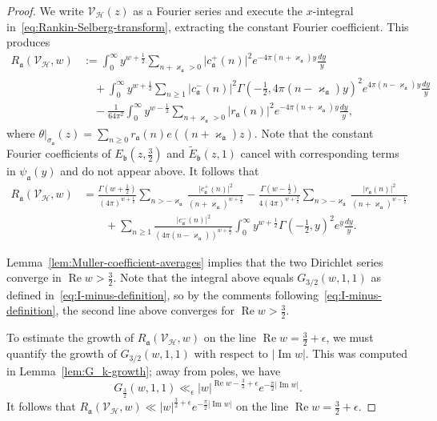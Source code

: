 \documentclass[11pt,reqno]{amsart}
\theoremstyle{plain}
\theoremstyle{definition}
\numberwithin{equation}{section}
\renewcommand{\Im}{\operatorname{Im}}
\renewcommand{\Re}{\operatorname{Re}}
\begin{document}
\begin{proof}
We write $\mathcal{V}_\mathcal{H}(z)$ as a Fourier series and execute the $x$-integral in~\eqref{eq:Rankin-Selberg-transform}, extracting the constant Fourier coefficient. This produces
\begin{align} \label{eq:Rankin-Selberg-transform-unfolded}
	R_\mathfrak{a}(\mathcal{V}_\mathcal{H}, w)
		& := \int_0^\infty y^{w+\frac{1}{2}} 
		\sum_{n +\varkappa_\mathfrak{a} > 0} \vert c_\mathfrak{a}^+(n) \vert^2 
		e^{-4\pi (n+\varkappa_\mathfrak{a}) y} \frac{dy}{y} \\
		& \quad +
		\int_0^\infty y^{w+\frac{1}{2}} \sum_{n \geq 1} \vert c_\mathfrak{a}^-(n) \vert^2
		\Gamma(-\tfrac{1}{2},4\pi (n-\varkappa_\mathfrak{a}) y)^2 
		e^{4\pi (n-\varkappa_\mathfrak{a}) y} \frac{dy}{y} \\
		& \quad - \frac{1}{64\pi^2} 
		\int_0^\infty y^{w-\frac{1}{2}}
			\sum_{n +\varkappa_\mathfrak{a} > 0} \vert r_\mathfrak{a}(n) \vert^2 e^{-4\pi (n + \varkappa_\mathfrak{a}) y} \frac{dy}{y},
\end{align}
where $\theta\vert_{\sigma_{\mathfrak{a}}}(z) = \sum_{n \geq 0} r_\mathfrak{a}(n) e((n+\varkappa_\mathfrak{a})z)$. Note that the constant Fourier coefficients of $E_\mathfrak{b}(z,\frac{3}{2})$ and $\widetilde{E}_\mathfrak{b}(z,1)$ cancel with corresponding terms in $\psi_{\mathfrak{a}}(y)$ and do not appear above. It follows that
\begin{align*}
	R_\mathfrak{a}(\mathcal{V}_\mathcal{H}, w)
		& = \frac{\Gamma(w+\frac{1}{2})}{(4\pi)^{w+\frac{1}{2}}}
		\sum_{n > -\varkappa_\mathfrak{a}} \!
				\frac{\vert c_\mathfrak{a}^+(n) \vert^2}{(n+\varkappa_\mathfrak{a})^{w+\frac{1}{2}}} 
		- \frac{\Gamma(w-\frac{1}{2})}{4 (4\pi)^{w+\frac{3}{2}}} 
			\sum_{n > -\varkappa_\mathfrak{a}} \!
				\frac{\vert r_\mathfrak{a}(n) \vert^2}{(n+\varkappa_\mathfrak{a})^{w-\frac{1}{2}}}  \\
		& \qquad 
		+ \sum_{n \geq 1} 
		\frac{\vert c_\mathfrak{a}^-(n) \vert^2}{(4\pi(n-\varkappa_\mathfrak{a}))^{w+\frac{1}{2}}}
		\int_0^\infty y^{w+\frac{1}{2}} \Gamma(-\tfrac{1}{2}, y)^2 e^{y} \frac{dy}{y}.
\end{align*}

Lemma~\ref{lem:Muller-coefficient-averages} implies that the two Dirichlet series converge in $\Re w > \frac{3}{2}$. Note that the integral above equals $G_{3/2}(w,1,1)$ as defined in~\eqref{eq:I-minus-definition}, so by the comments following~\eqref{eq:I-minus-definition}, the second line above converges for $\Re w > \frac{3}{2}$.

To estimate the growth of $R_\mathfrak{a}(\mathcal{V}_\mathcal{H}, w)$ on the line $\Re w = \frac{3}{2} + \epsilon$, we must quantify the growth of $G_{3/2}(w,1,1)$ with respect to $\vert \Im w \vert$. This was computed in Lemma~\ref{lem:G_k-growth}; away from poles, we have
\[
	G_\frac{3}{2}(w,1,1)  \ll_\epsilon \vert w \vert^{\Re w - \frac{3}{2}+\epsilon} e^{-\frac{\pi}{2} \vert \Im w \vert}.
\]
It follows that $R_\mathfrak{a}(\mathcal{V}_\mathcal{H}, w) \ll \vert w \vert^{\frac{3}{2}+\epsilon} e^{-\frac{\pi}{2} \vert \Im w \vert}$ on the line $\Re w = \frac{3}{2} + \epsilon$.


\end{proof}
\end{document}
